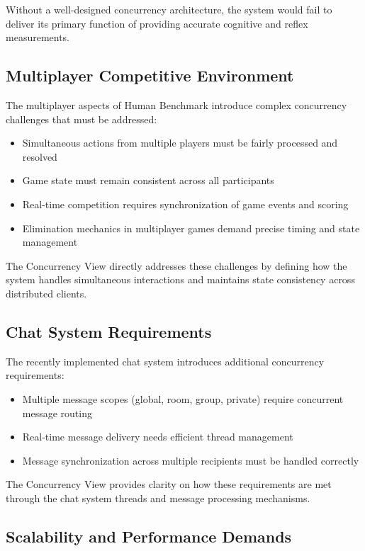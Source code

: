 Without a well-designed concurrency architecture, the system would fail to deliver its primary function of providing accurate cognitive and reflex measurements.

\subsection{Multiplayer Competitive Environment}

The multiplayer aspects of Human Benchmark introduce complex concurrency challenges that must be addressed:

\begin{itemize}
    \item Simultaneous actions from multiple players must be fairly processed and resolved
    \item Game state must remain consistent across all participants
    \item Real-time competition requires synchronization of game events and scoring
    \item Elimination mechanics in multiplayer games demand precise timing and state management
\end{itemize}

The Concurrency View directly addresses these challenges by defining how the system handles simultaneous interactions and maintains state consistency across distributed clients.

\subsection{Chat System Requirements}

The recently implemented chat system introduces additional concurrency requirements:

\begin{itemize}
    \item Multiple message scopes (global, room, group, private) require concurrent message routing
    \item Real-time message delivery needs efficient thread management
    \item Message synchronization across multiple recipients must be handled correctly
\end{itemize}

The Concurrency View provides clarity on how these requirements are met through the chat system threads and message processing mechanisms.

\subsection{Scalability and Performance Demands}

